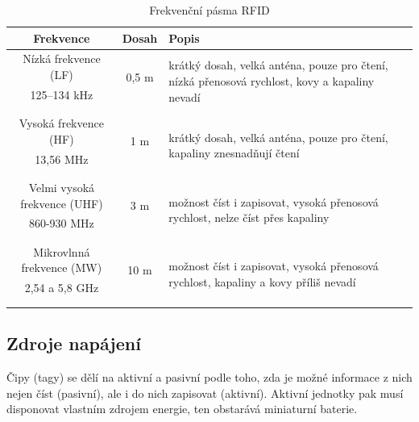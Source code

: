 \documentclass[czech,BP]{thesiskiv}
\begin{document}
\begin{table}[H]
\centering
\begin{tabular}{ c | c | p{5cm}}
 	\textbf{Frekvence} & \textbf{Dosah} & \textbf{Popis} \\ \hline\hline
    Nízká frekvence (LF) & \multirow{2}{*}{0,5 m} & \multirow{4}{5cm}{krátký dosah, velká anténa, pouze pro čtení, nízká přenosová rychlost, kovy a kapaliny nevadí} \\
    125–134 kHz &  & \\ 
    &  & \\ &  & \\ \hline
    
    Vysoká frekvence (HF) & \multirow{2}{*}{1 m} & \multirow{4}{5cm}{krátký dosah, velká anténa, pouze pro čtení, kapaliny znesnadňují čtení}  \\ 
	13,56 MHz &  & \\ 
	&  & \\ &  & \\ \hline       
	
    Velmi vysoká frekvence (UHF) & \multirow{2}{*}{3 m} &  \multirow{4}{5cm}{možnost číst i zapisovat, vysoká přenosová rychlost, nelze číst přes kapaliny }\\  
    860-930 MHz &  & \\ 
    &  & \\ &  & \\ \hline
    
    Mikrovlnná frekvence (MW) &  \multirow{2}{*}{10 m} & \multirow{4}{5cm}{možnost číst i zapisovat, vysoká přenosová rychlost, kapaliny a kovy příliš nevadí } \\
	2,54 a 5,8 GHz &  & \\ 
	&  & \\ &  & \\ \hline
\end{tabular}
\caption{Frekvenční pásma RFID}
\label{table:rfid_frekvence}
\end{table}

\newpage

\subsection{Zdroje napájení}
Čipy (tagy) se dělí na aktivní a pasivní podle toho, zda je možné informace z nich nejen číst (pasivní), ale i do nich zapisovat (aktivní). Aktivní jednotky pak musí disponovat vlastním zdrojem energie, ten obstarává miniaturní baterie.\cite{dolevcek2010identifikace}
\end{document}
